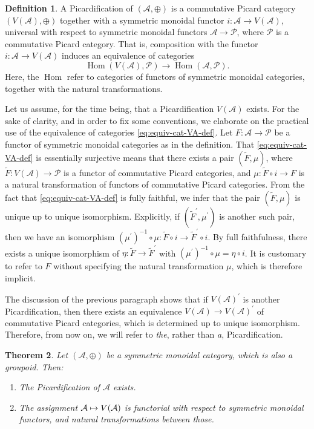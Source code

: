 \documentclass[11pt]{article}
\newcommand\mto{\mathchoice{\longmapsto}{\mapsto}{\mapsto}{\mapsto}}
\theoremstyle{plain}
\newtheorem{theorem}{Theorem}[section]
\theoremstyle{definition}
\newtheorem{definition}[theorem]{Definition}
\newcommand{\Acal}{\mathcal A}
\newcommand{\Pcal}{\mathcal P}
\DeclareMathOperator{\Hom}{Hom}
\begin{document}
\begin{definition}\label{def:Picardification}
A Picardification of $(\Acal, \oplus)$ is a commutative Picard category $(V(\Acal), \oplus)$ together with a symmetric monoidal functor $i\colon\Acal\to V(\Acal)$, universal with respect to symmetric monoidal functors $\Acal \to \Pcal$, where $\Pcal$ is a commutative Picard category. That is, composition with the functor $i\colon \Acal\to V(\Acal)$ induces an equivalence of categories
\begin{equation}\label{eq:equiv-cat-VA-def}
\Hom(V(\Acal),\Pcal)\to\Hom(\Acal,\Pcal).
\end{equation}
Here, the $\Hom$ refer to categories of functors of symmetric monoidal categories, together with the natural transformations.
\end{definition}
Let us assume, for the time being, that a Picardification $V(\Acal)$ exists. For the sake of clarity, and in order to fix some conventions, we elaborate on the practical use of the equivalence of categories \eqref{eq:equiv-cat-VA-def}. Let $F\colon\Acal\to\Pcal$ be a functor of symmetric monoidal categories as in the definition. That \eqref{eq:equiv-cat-VA-def} is essentially surjective means that there exists a pair $(\widetilde{F},\mu)$, where $\widetilde{F}\colon V(\Acal)\to\Pcal$ is a functor of commutative Picard categories, and $\mu\colon \widetilde{F}\circ i\to F$ is a natural transformation of functors of commutative Picard categories. From the fact that \eqref{eq:equiv-cat-VA-def} is fully faithful, we infer that the pair $(\widetilde{F},\mu)$ is unique up to unique isomorphism. Explicitly, if $(\widetilde{F}^{\prime},\mu^{\prime})$ is another such pair, then we have an isomorphism $(\mu^{\prime})^{-1}\circ\mu\colon \widetilde{F}\circ i\to\widetilde{F}^{\prime}\circ i $. By full faithfulness, there exists a unique isomorphism of $\eta\colon\widetilde{F}\to\widetilde{F}^{\prime}$ with $(\mu^{\prime})^{-1}\circ\mu=\eta\circ i$. It is customary to refer to $F$ without specifying the natural transformation $\mu$, which is therefore implicit.

The discussion of the previous paragraph shows that if $V(\Acal)^{\prime}$ is another Picardification, then there exists an equivalence $V(\Acal)\to V(\Acal)^{\prime}$ of commutative Picard categories, which is determined up to unique isomorphism. Therefore, from now on, we will refer to \emph{the}, rather than \emph{a}, Picardification.

\begin{theorem}\label{thm:VA}
Let $(\Acal, \oplus)$ be a symmetric monoidal category, which is also a groupoid. Then:
\begin{enumerate}
\item The Picardification of $\Acal$ exists.
\item The assignment $\Acal\mto V(\Acal)$ is functorial with respect to symmetric monoidal functors, and natural transformations between those.
\end{enumerate}
\end{theorem}
\end{document}
